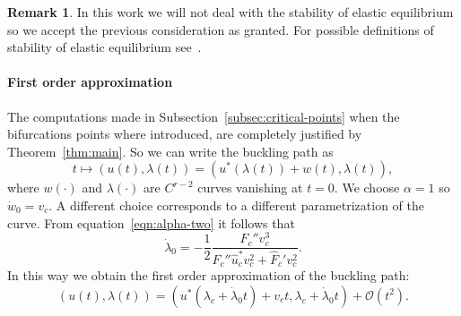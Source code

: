 \documentclass[a4paper,11pt]{article}
\theoremstyle{definition}
\newtheorem{rmk}[prop]{Remark}
\begin{document}
\begin{rmk}
In this work we will not deal with the stability of elastic equilibrium so we accept the previous consideration as granted. For possible definitions of stability of elastic equilibrium see~\cite[Chapter 2]{koiter}.
\end{rmk}

\paragraph{First order approximation} The computations made in Subsection~\ref{subsec:critical-points} when the bifurcations points where introduced, are completely justified by Theorem~\ref{thm:main}. So we can write the buckling path as
\[
t\mapsto(u(t),\lambda(t))=\left(u^*(\lambda(t))+w(t),\lambda(t)\right),
\]
where $w(\cdot)$ and $\lambda(\cdot)$ are $C^{r-2}$ curves vanishing at $t=0$. We choose $\alpha=1$ so $\dot w_0=v_c$. A different choice corresponds to a different parametrization of the curve. From equation~\eqref{eqn:alpha-two} it follows that
\begin{equation}
\label{eqn:lambda-dot}
\dot\lambda_0=-\frac{1}{2}\frac{F_c''v_c^3}{F_c''\hat u_c^*v_c^2+\hat{F}_c'v_c^2}.
\end{equation}
In this way we obtain the first order approximation of the buckling path:
\begin{equation}
\label{eqn:first-order}
(u(t),\lambda(t))=(u^*(\lambda_c+\dot\lambda_0t)+v_ct,\lambda_c+\dot\lambda_0t)+\mathscr{O}(t^2).
\end{equation}
\end{document}
